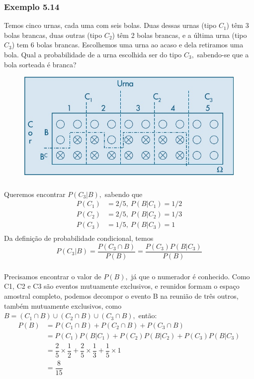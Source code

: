 \documentclass[14pt,aspectratio=1610]{beamer}
\begin{document}
\begin{frame}{}
\frametitle{Exemplo 5.14}%
  \begin{block}{}
  \justifying
Temos cinco urnas, cada uma com seis bolas. Duas dessas urnas (tipo $C_1$) têm 3 bolas brancas, duas outras (tipo $C_2$) têm 2 bolas brancas, e a última urna (tipo $C_3$) tem 6 bolas brancas. Escolhemos uma urna ao acaso e dela retiramos uma bola. Qual a probabilidade de a urna escolhida ser do tipo $C_3,$ sabendo-se que a bola sorteada é branca?
\end{block}
    \begin{figure}[H]
    \centering
    \includegraphics[height=0.3\textwidth,width=15cm]{figs/ex5_14}
    \end{figure}
  
\end{frame}


\begin{frame}{}
\frametitle{}
\begin{block}{}
\justifying
Queremos encontrar $P(C_3|B),$ sabendo que
\begin{align*}
P(C_{1})&=2/5,\ P(B|C_{1})=1/2\\
P(C_{2})&=2/5,\ P(B|C_{2})=1/3\\
P(C_{3})&=1/5,\ P(B|C_{3})=1\\
\end{align*}
Da definição de probabilidade condicional, temos
$$P(C_{3}|B)=\dfrac{P(C_{3}\cap B)}{P(B)}=\dfrac{P(C_{3})P(B|C_{3})}{P(B)}$$
\end{block}
\end{frame}

\begin{frame}{}
\frametitle{}
\begin{block}{}
\justifying
Precisamos encontrar o valor de $P(B),$ já que o numerador é conhecido. Como C1,
C2 e C3 são eventos mutuamente exclusivos, e reunidos formam o espaço amostral
completo, podemos decompor o evento B na reunião de três outros, também mutuamente
exclusivos, como $B=(C_{1}\cap B)\cup (C_{2}\cap B)\cup (C_{3}\cap B),$ então:
\begin{align*}
P(B)&=P(C_{1}\cap B)+P(C_{2}\cap B)+P(C_{3}\cap B)\\
&=P(C_{1})P(B|C_{1})+P(C_{2})P(B|C_{2})+P(C_{3})P(B|C_{3})\\
&=\dfrac{2}{5}\times \dfrac{1}{2}+\dfrac{2}{5}\times \dfrac{1}{3}+\dfrac{1}{5}\times 1\\
&=\dfrac{8}{15}
\end{align*}
\end{block}
\end{frame}
\end{document}
